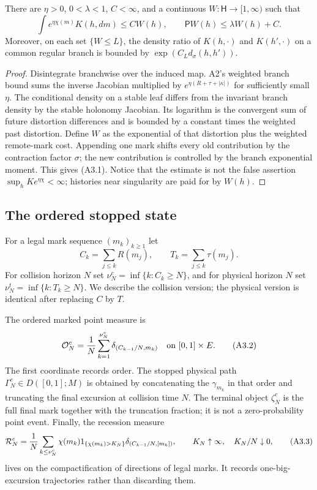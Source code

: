 \begin{lemma}
\label{lem:r23-a3-moment}
There are $\eta>0$, $0<\lambda<1$, $C<\infty$, and a continuous
$W:\mathsf H\to[1,\infty)$ such that
\[
 \int e^{\eta\chi(m)}K(h,dm)\le C W(h),
 \qquad \mathsf P W(h)\le\lambda W(h)+C.                 \tag{A3.1}
\]
Moreover, on each set $\{W\le L\}$, the density ratio of $K(h,\cdot)$ and
$K(h',\cdot)$ on a common regular branch is bounded by
$\exp(C_Ld_\sigma(h,h'))$.
\end{lemma}

\begin{proof}
Disintegrate branchwise over the induced map.  A2's weighted branch bound
sums the inverse Jacobian multiplied by $e^{\eta(R+\tau+|\kappa|)}$ for
sufficiently small $\eta$.  The conditional density on a stable leaf differs
from the invariant branch density by the stable holonomy Jacobian.  Its
logarithm is the convergent sum of future distortion differences and is
bounded by a constant times the weighted past distortion.  Define $W$ as the
exponential of that distortion plus the weighted remote-mark cost.  Appending
one mark shifts every old contribution by the contraction factor $\sigma$;
the new contribution is controlled by the branch exponential moment.  This
gives (A3.1).  Notice that the estimate is not the false assertion
$\sup_hKe^{\eta\chi}<\infty$; histories near singularity are paid for by
$W(h)$.
\end{proof}

\subsection{The ordered stopped state}

For a legal mark sequence $(m_k)_{k\ge1}$ let
\[
 C_k=\sum_{j\le k}R(m_j),\qquad T_k=\sum_{j\le k}\tau(m_j).
\]
For collision horizon $N$ set
$\nu_N^c=\inf\{k:C_k\ge N\}$, and for physical horizon $N$ set
$\nu_N^t=\inf\{k:T_k\ge N\}$.  We describe the collision version; the
physical version is identical after replacing $C$ by $T$.

The ordered marked point measure is
\[
 \mathcal O_N^c={1\over N}
 \sum_{k=1}^{\nu_N^c}
 \delta_{(C_{k-1}/N,m_k)}
 \quad\text{on }[0,1]\times E.                           \tag{A3.2}
\]
The first coordinate records order.  The stopped physical path
$\Gamma_N^c\in D([0,1];M)$ is obtained by concatenating the $\gamma_{m_k}$ in
that order and truncating the final excursion at collision time $N$.  The
terminal object $\zeta_N^c$ is the full final mark together with the truncation
fraction; it is not a zero-probability point event.  Finally, the recession
measure
\[
 \mathcal R_N^c={1\over N}
 \sum_{k\le\nu_N^c}\chi(m_k)
 1_{\{\chi(m_k)>K_N\}}
 \delta_{(C_{k-1}/N,[m_k])},
 \qquad K_N\uparrow\infty,\quad K_N/N\downarrow0,         \tag{A3.3}
\]
lives on the compactification of directions of legal marks.  It records
one-big-excursion trajectories rather than discarding them.


